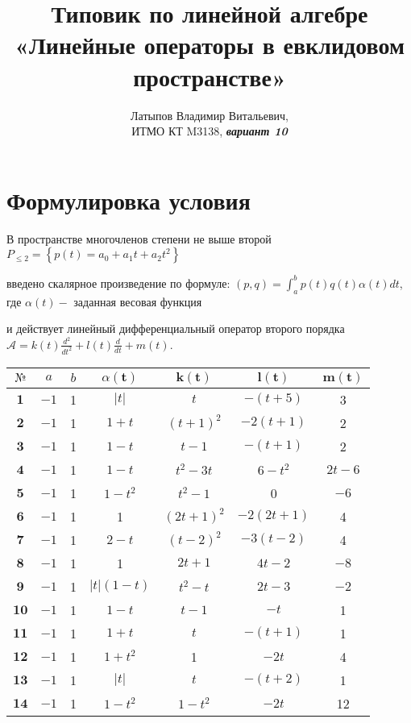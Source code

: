\documentclass[12pt, a4paper]{article}
\author{Латыпов Владимир Витальевич, \\ ИТМО КТ M3138, \Huge{\textit{\textbf{вариант 10}}}}
\title{Типовик по линейной алгебре «Линейные операторы в евклидовом пространстве»}
\begin{document}
    \tit

    \section{Формулировка условия}

    В пространстве многочленов степени не выше второй $P_{\leq 2}=\left\{p(t)=a_{0}+a_{1} t+a_{2} t^{2}\right\}$ 
    
    введено скалярное произведение по формуле: $(p, q)=\int_{a}^{b} p(t) q(t) \alpha(t) d t$, где $\alpha(t)-$ заданная весовая функция 
    
    и действует линейный дифференциальный оператор второго порядка $\mathcal{A}=k(t) \frac{d^{2}}{d t^{2}}+l(t) \frac{d}{d t}+m(t)$.
    
    \begin{tabular}{|c|c|c|c|c|c|c|}
    \hline$№$ & $a$ & $b$ & $\alpha(\mathbf{t})$ & $\mathbf{k}(\mathbf{t})$ & $\mathbf{l}(\mathbf{t})$ & $\mathbf{m}(\mathbf{t})$ \\
    \hline $\mathbf{1}$ & $-1$ & 1 & $|t|$ & $t$ & $-(t+5)$ & 3 \\
    \hline $\mathbf{2}$ & $-1$ & 1 & $1+t$ & $(t+1)^{2}$ & $-2(t+1)$ & 2 \\
    \hline $\mathbf{3}$ & $-1$ & 1 & $1-t$ & $t-1$ & $-(t+1)$ & 2 \\
    \hline $\mathbf{4}$ & $-1$ & 1 & $1-t$ & $t^{2}-3 t$ & $6-t^{2}$ & $2 t-6$ \\
    \hline $\mathbf{5}$ & $-1$ & 1 & $1-t^{2}$ & $t^{2}-1$ & 0 & $-6$ \\
    \hline $\mathbf{6}$ & $-1$ & 1 & 1 & $(2 t+1)^{2}$ & $-2(2 t+1)$ & 4 \\
    \hline $\mathbf{7}$ & $-1$ & 1 & $2-t$ & $(t-2)^{2}$ & $-3(t-2)$ & 4 \\
    \hline $\mathbf{8}$ & $-1$ & 1 & 1 & $2 t+1$ & $4 t-2$ & $-8$ \\
    \hline $\mathbf{9}$ & $-1$ & 1 & $|t|(1-t)$ & $t^{2}-t$ & $2 t-3$ & $-2$ \\
    \hline $\mathbf{1 0}$ & $-1$ & 1 & $1-t$ & $t-1$ & $-t$ & 1 \\
    \hline $\mathbf{1 1}$ & $-1$ & 1 & $1+t$ & $t$ & $-(t+1)$ & 1 \\
    \hline $\mathbf{1 2}$ & $-1$ & 1 & $1+t^{2}$ & 1 & $-2 t$ & 4 \\
    \hline $\mathbf{1 3}$ & $-1$ & 1 & $|t|$ & $t$ & $-(t+2)$ & 1 \\
    \hline $\mathbf{1 4}$ & $-1$ & 1 & $1-t^{2}$ & $1-t^{2}$ & $-2 t$ & 12 \\

\end{tabular}
\end{document}

